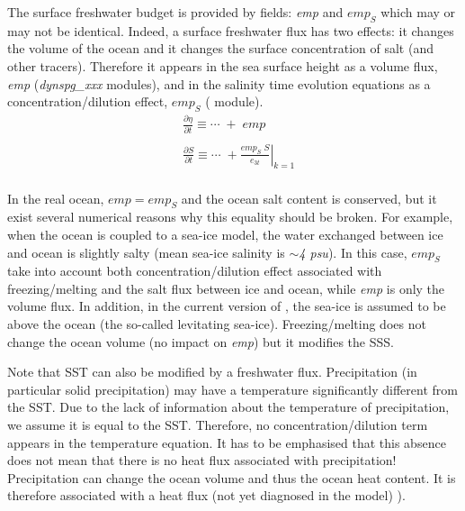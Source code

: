 The surface freshwater budget is provided by fields: \textit{emp} and $\textit{emp}_S$ which 
may or may not be identical. Indeed, a surface freshwater flux has two effects: 
it changes the volume of the ocean and it changes the surface concentration of 
salt (and other tracers). Therefore it appears in the sea surface height as a volume 
flux, \textit{emp} (\textit{dynspg\_xxx} modules), and in the salinity time evolution equations 
as a concentration/dilution effect, 
$\textit{emp}_{S}$ ( module). 
\begin{equation} \label{Eq_trasbc_emp}
\begin{aligned}
&\frac{\partial \eta }{\partial t}\equiv \cdots \;+\;\textit{emp}\quad  \\ 
\\
 &\frac{\partial S}{\partial t}\equiv \cdots \;+\left. {\frac{\textit{emp}_S \;S}{e_{3t} }} \right|_{k=1} \\ 
 \end{aligned}
\end{equation} 

In the real ocean, $\textit{emp}=\textit{emp}_S$ and the ocean salt content is conserved, 
but it exist several numerical reasons why this equality should be broken. 
For example, when the ocean is coupled to a sea-ice model, the water exchanged between 
ice and ocean is slightly salty (mean sea-ice salinity is $\sim $\textit{4 psu}). In this case, 
$\textit{emp}_{S}$ take into account both concentration/dilution effect associated with 
freezing/melting and the salt flux between ice and ocean, while \textit{emp} is 
only the volume flux. In addition, in the current version of \NEMO, the sea-ice is 
assumed to be above the ocean (the so-called levitating sea-ice). Freezing/melting does 
not change the ocean volume (no impact on \textit{emp}) but it modifies the SSS.

Note that SST can also be modified by a freshwater flux. Precipitation (in 
particular solid precipitation) may have a temperature significantly different from 
the SST. Due to the lack of information about the temperature of 
precipitation, we assume it is equal to the SST. Therefore, no 
concentration/dilution term appears in the temperature equation. It has to 
be emphasised that this absence does not mean that there is no heat flux 
associated with precipitation! Precipitation can change the ocean volume and thus the
ocean heat content. It is therefore associated with a heat flux (not yet  
diagnosed in the model) \citep{Roullet_Madec_JGR00}).

